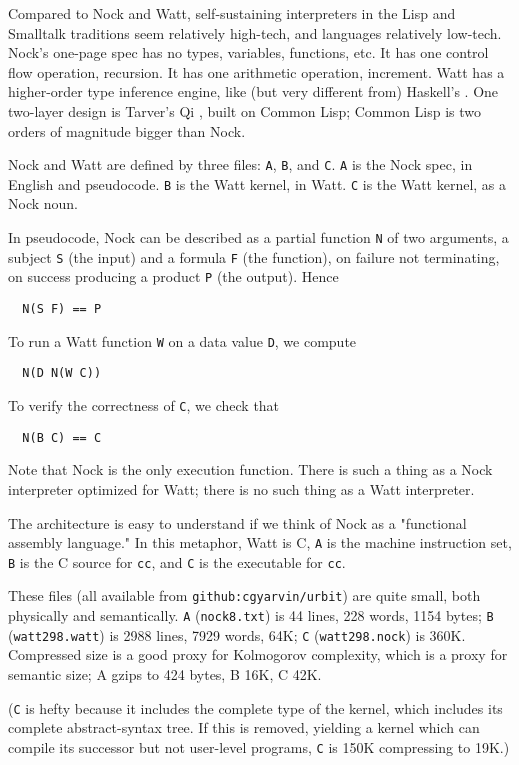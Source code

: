 \documentclass[10pt, nocopyrightspace]{sigplanconf}
\begin{document}
Compared to Nock and Watt, self-sustaining interpreters
in the Lisp and Smalltalk traditions seem relatively high-tech,
and languages relatively low-tech.  Nock's one-page spec has no
types, variables, functions, etc.  It has one control flow
operation, recursion.  It has one arithmetic operation,
increment.  Watt has a higher-order type inference engine, like
(but very different from) Haskell's \citep{haskell98}.  One two-layer design is
Tarver's Qi \citep{tarverqi}, built on Common Lisp; Common Lisp is two orders
of magnitude bigger than Nock.

Nock and Watt are defined by three files: \verb|A|, \verb|B|, and \verb|C|.  \verb|A|
is the Nock spec, in English and pseudocode.  \verb|B| is the Watt
kernel, in Watt.  \verb|C| is the Watt kernel, as a Nock noun.

In pseudocode, Nock can be described as a partial function \verb|N| of
two arguments, a subject \verb|S| (the input) and a formula \verb|F| (the
function), on failure not terminating, on success producing a
product \verb|P| (the output).  Hence
\begin{verbatim}
  N(S F) == P
\end{verbatim}
To run a Watt function \verb|W| on a data value \verb|D|, we compute
\begin{verbatim}
  N(D N(W C))
\end{verbatim}
To verify the correctness of \verb|C|, we check that 
\begin{verbatim}
  N(B C) == C
\end{verbatim}

Note that Nock is the only execution function.  There is such a
thing as a Nock interpreter optimized for Watt; there is no such
thing as a Watt interpreter.

The architecture is easy to understand if we think of Nock as a
"functional assembly language."  In this metaphor, Watt is C, \verb|A|
is the machine instruction set, \verb|B| is the C source for \verb|cc|, and
\verb|C| is the executable for \verb|cc|.
 
These files (all available from \verb|github:cgyarvin/urbit|) are
quite small, both physically and semantically.  \verb|A| (\verb|nock8.txt|)
is 44 lines, 228 words, 1154 bytes; \verb|B|
(\verb|watt298.watt|) is 2988 
lines, 7929 words, 64K; \verb|C| (\verb|watt298.nock|) is 360K.  Compressed
size is a good proxy for Kolmogorov complexity, which is a proxy
for semantic size; A gzips to 424 bytes, B 16K, C 42K.  

(\verb|C| is hefty because it
includes the complete type of the kernel, which includes its
complete abstract-syntax tree.  If this is removed, yielding 
a kernel which can compile its successor but not user-level
programs, \verb|C| is 150K compressing to 19K.)
\end{document}
